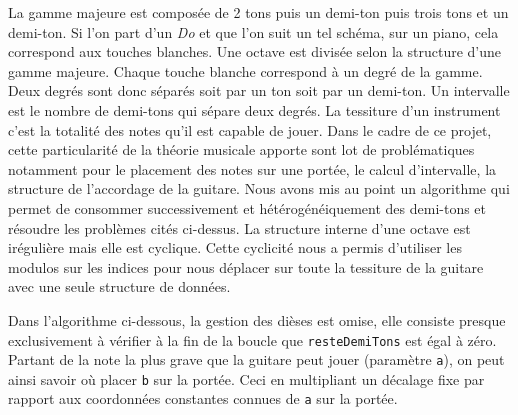 \documentclass{scrreprt}
\begin{document}
La gamme majeure est composée de 2 tons puis un demi-ton puis trois tons et un demi-ton.
Si l'on part d'un \textit{Do} et que l'on suit un tel schéma, sur un piano, cela correspond aux touches blanches.
Une octave est divisée selon la structure d'une gamme majeure.
Chaque touche blanche correspond à un degré de la gamme.
Deux degrés sont donc séparés soit par un ton soit par un demi-ton.
Un intervalle est le nombre de demi-tons qui sépare deux degrés.
La tessiture d'un instrument c'est la totalité des notes qu'il est capable de jouer.
Dans le cadre de ce projet, cette particularité de la théorie musicale apporte sont lot de problématiques notamment pour le placement des notes sur une portée, le calcul d'intervalle, la structure de l'accordage de la guitare.
\newline
Nous avons mis au point un algorithme qui permet de consommer successivement et hétérogénéiquement des demi-tons et résoudre les problèmes cités ci-dessus.
La structure interne d'une octave est irégulière mais elle est cyclique.
Cette cyclicité nous a permis d'utiliser les modulos sur les indices pour nous déplacer sur toute la tessiture de la guitare avec une seule structure de données.

Dans l'algorithme ci-dessous, la gestion des dièses est omise, elle consiste presque exclusivement à vérifier à la fin de la boucle que \texttt{resteDemiTons} est égal à zéro.
Partant de la note la plus grave que la guitare peut jouer (paramètre \texttt{a}), on peut ainsi savoir où placer \texttt{b} sur la portée.
Ceci en multipliant un décalage fixe par rapport aux coordonnées constantes connues de \texttt{a} sur la portée.
\end{document}
